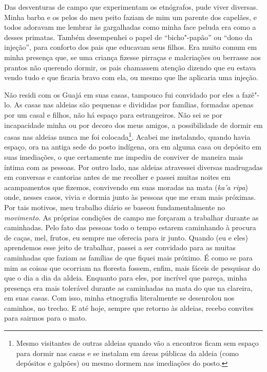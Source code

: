 Das desventuras de campo que experimentam os etnógrafos, pude viver
diversas. Minha barba e os pelos do meu peito faziam de mim um parente
dos capelães, e todos adoravam me lembrar às gargalhadas como minha face
peluda era como a desses primatas. Também desempenhei o papel de
``bicho"-papão'' ou ``dono da injeção'', para conforto dos pais que
educavam seus filhos. Era muito comum em minha presença que, se uma
criança fizesse pirraças e malcriações ou berrasse aos prantos não
querendo dormir, os pais chamassem atenção dizendo que eu estava vendo
tudo e que ficaria bravo com ela, ou mesmo que lhe aplicaria uma
injeção.

Não residi com os Guajá em suas casas, tampouco fui convidado por eles a
fazê"-lo. As casas nas aldeias são pequenas e divididas por famílias,
formadas apenas por um casal e filhos, não há espaço para estrangeiros.
Não sei se por incapacidade minha ou por decoro dos meus amigos, a
possibilidade de dormir em casas nas aldeias nunca me foi
colocada\footnote{Mesmo visitantes de outras aldeias quando vão a
  encontros ficam sem espaço para dormir nas casas e se instalam em
  áreas públicas da aldeia (como depósitos e galpões) ou mesmo dormem
  nas imediações do posto.}. Acabei me instalando, quando havia espaço,
ora na antiga sede do posto indígena, ora em alguma casa ou depósito em
suas imediações, o que certamente me impediu de conviver de maneira mais
íntima com as pessoas. Por outro lado, nas aldeias atravessei diversas
madrugadas em conversas e cantorias antes de me recolher e passei muitas
noites em acampamentos que fizemos, convivendo em suas moradas na mata
(\emph{ka'a ripa}) onde, nesses casos, vivia e dormia junto às pessoas
que me eram mais próximas. Por tais motivos, meu trabalho diário se
baseou fundamentalmente no \emph{movimento}. As próprias condições de
campo me forçaram a trabalhar durante as caminhadas. Pelo fato das
pessoas todo o tempo estarem caminhando à procura de caças, mel, frutos,
eu sempre me oferecia para ir junto. Quando (eu e eles) aprendemos esse
jeito de trabalhar, passei a ser convidado para as muitas caminhadas que
faziam as famílias de que fiquei mais próximo. É como se para mim as
coisas que ocorriam na floresta fossem, enfim, mais fáceis de pesquisar
do que o dia a dia da aldeia. Enquanto para eles, por incrível que
pareça, minha presença era mais tolerável durante as caminhadas na mata
do que na clareira, em suas casas. Com isso, minha etnografia
literalmente se desenrolou nos caminhos, no trecho. E até hoje, sempre
que retorno às aldeias, recebo convites para sairmos para o mato.

